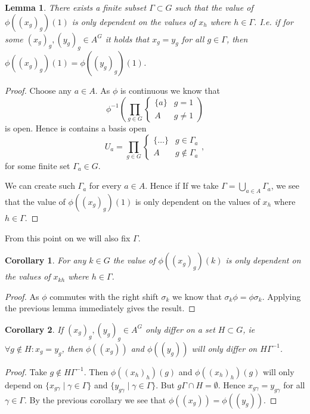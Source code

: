 \documentclass[titlepage, a4paper]{article}
\newtheorem{lemma}{Lemma}
\newtheorem{corollary}{Corollary}
\theoremstyle{remark}
\begin{document}
\begin{lemma}
	There exists a finite subset $\Gamma \subset G$ such that the value of $\phi((x_g)_g)(1)$ is only dependent on the values of $x_h$ where  $h \in \Gamma$. 
	I.e. if for some  $(x_g)_g, (y_g)_g \in A^{G}$ it holds that $x_g = y_g$ for all $g \in \Gamma$, then $\phi((x_g)_g)(1) = \phi((y_g)_g)(1)$.
\end{lemma}
\begin{proof}
	Choose any $a \in A$. As $\phi$ is continuous we know that \[
	\phi^{-1}\left( \prod_{g\in G} \begin{cases}
			\{a\} & g = 1\\
			A & g \ne 1
	\end{cases} \right)
\]
	is open. Hence is contains a basis open  \[
	U_a=\prod_{g \in G}\begin{cases}
		\{\ldots\} & g \in \Gamma_a\\
		A & g \not\in \Gamma_a
	\end{cases}
	,\] 
	for some finite set $\Gamma_a \in G$. 

	We can create such  $\Gamma_a$ for every $a \in A$. 
	Hence if  
	If we take  $\Gamma = \bigcup_{a \in A} \Gamma_a$, we see that the value of $\phi((x_g)_g)(1)$ is only dependent on the values of  $x_h$ where $h \in \Gamma$. 
\end{proof}
From this point on we will also fix $\Gamma$. 
\begin{corollary}
	For any $k \in G$ the value of $\phi((x_g)_g)(k)$ is only dependent on the values of $x_{kh}$ where $h \in \Gamma$.
\end{corollary}	
\begin{proof}
	As $\phi$ commutes with the right shift  $\sigma_k$ we know that $\sigma_k\phi = \phi\sigma_k$. Applying the previous lemma immediately gives the result.
\end{proof}

\begin{corollary}\label{cor:differ_in_image}
	If $(x_g)_g, (y_g)_g \in A^{G}$ only differ on a set $H \subset G$, ie $\forall g \not\in H:x_g = y_g$,
	then  $\phi((x_g))$ and $\phi((y_g))$ will only differ on $H\Gamma^{-1}$.
\end{corollary}
\begin{proof}
	Take $g \not\in H\Gamma^{-1}$. Then $\phi((x_h)_h)(g)$ and $\phi((x_h)_h)(g)$ will only depend on  $\{x_{g\gamma}\mid \gamma \in \Gamma\}$ and $\{y_{g\gamma}\mid \gamma \in \Gamma\} $. But  $g\Gamma \cap H = \emptyset$. Hence $x_{g\gamma} = y_{g\gamma}$ for all $\gamma \in \Gamma$. By the previous corollary we see that $\phi((x_g)) = \phi((y_g))$.
\end{proof}
\end{document}
